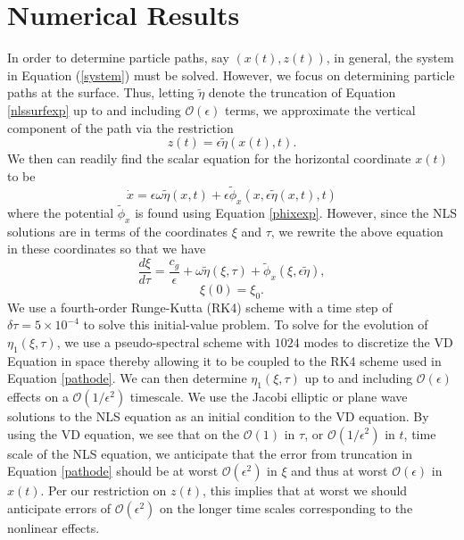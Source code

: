 \documentclass{JFM_Style/jfm}
\begin{document}
\section{Numerical Results}
In order to determine particle paths, say $(x(t),z(t))$, in general, the system in Equation (\ref{system}) must be solved.  However, we focus on determining particle paths at the surface. Thus, letting $\tilde{\eta}$ denote the truncation of Equation \eqref{nlssurfexp} up to and including $\mathcal{O}(\epsilon)$ terms, we approximate the vertical component of the path via the restriction  
\[
z(t) = \epsilon \tilde{\eta}(x(t),t).
\]
We then can readily find the scalar equation for the horizontal coordinate $x(t)$ to be
\[
\dot{x} = \epsilon\omega\tilde{\eta}(x,t) + \epsilon \tilde{\phi}_{x}(x,\epsilon\tilde{\eta}(x,t),t) 
\]
where the potential $\tilde{\phi}_{x}$ is found using Equation \eqref{phixexp}.  However, since the NLS solutions are in terms of the coordinates $\xi$ and $\tau$, we rewrite the above equation in these coordinates so that we have 
\begin{equation}
\frac{d \xi}{d\tau} =  \frac{c_{g}}{\epsilon} + \omega\tilde{\eta}\left(\xi,\tau\right) + \tilde{\phi}_{x}(\xi,\epsilon\tilde{\eta}),
\label{pathode}
\end{equation}
\[
\xi(0)=\xi_0.
\]
We use a fourth-order Runge-Kutta (RK4) scheme with a time step of $\delta \tau = 5\times10^{-4}$ to solve this initial-value problem.  To solve for the evolution of $\eta_{1}(\xi,\tau)$, we use a pseudo-spectral scheme with $1024$ modes to discretize the VD Equation in space thereby allowing it to be coupled to the RK4 scheme used in Equation \eqref{pathode}. We can then determine $\eta_{1}(\xi,\tau)$ up to and including $\mathcal{O}(\epsilon)$ effects on a $\mathcal{O}(1/\epsilon^{2})$ timescale.  We use the Jacobi elliptic or plane wave solutions to the NLS equation as an initial condition to the VD equation.  By using the VD equation, we see that on the $\mathcal{O}(1)$ in $\tau$, or $\mathcal{O}(1/\epsilon^{2})$ in $t$, time scale of the NLS equation, we anticipate that the error from truncation in Equation \eqref{pathode} should be at worst $\mathcal{O}(\epsilon^{2})$ in $\xi$ and thus at worst $\mathcal{O}(\epsilon)$ in $x(t)$.  Per our restriction on $z(t)$, this implies that at worst we should anticipate errors of $\mathcal{O}(\epsilon^{2})$ on the longer time scales corresponding to the nonlinear effects.  
\end{document}
